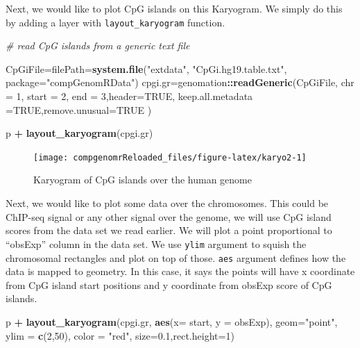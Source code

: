 \documentclass[12pt,]{krantz}
\newenvironment{Shaded}{\begin{snugshade}}{\end{snugshade}}
\newcommand{\CommentTok}[1]{\textcolor[rgb]{0.56,0.35,0.01}{\textit{#1}}}
\newcommand{\DataTypeTok}[1]{\textcolor[rgb]{0.13,0.29,0.53}{#1}}
\newcommand{\DecValTok}[1]{\textcolor[rgb]{0.00,0.00,0.81}{#1}}
\newcommand{\FloatTok}[1]{\textcolor[rgb]{0.00,0.00,0.81}{#1}}
\newcommand{\KeywordTok}[1]{\textcolor[rgb]{0.13,0.29,0.53}{\textbf{#1}}}
\newcommand{\NormalTok}[1]{#1}
\newcommand{\OperatorTok}[1]{\textcolor[rgb]{0.81,0.36,0.00}{\textbf{#1}}}
\newcommand{\OtherTok}[1]{\textcolor[rgb]{0.56,0.35,0.01}{#1}}
\newcommand{\StringTok}[1]{\textcolor[rgb]{0.31,0.60,0.02}{#1}}
\begin{document}
Next, we would like to plot CpG islands on this Karyogram. We simply do this
by adding a layer with \texttt{layout\_karyogram} function.

\begin{Shaded}
\begin{Highlighting}[]
\CommentTok{# read CpG islands from a generic text file}

\NormalTok{CpGiFile=filePath=}\KeywordTok{system.file}\NormalTok{(}\StringTok{"extdata"}\NormalTok{,}
                      \StringTok{"CpGi.hg19.table.txt"}\NormalTok{,}
                      \DataTypeTok{package=}\StringTok{"compGenomRData"}\NormalTok{)}
\NormalTok{cpgi.gr=genomation}\OperatorTok{::}\KeywordTok{readGeneric}\NormalTok{(CpGiFile, }
            \DataTypeTok{chr =} \DecValTok{1}\NormalTok{, }\DataTypeTok{start =} \DecValTok{2}\NormalTok{, }\DataTypeTok{end =} \DecValTok{3}\NormalTok{,}\DataTypeTok{header=}\OtherTok{TRUE}\NormalTok{, }
          \DataTypeTok{keep.all.metadata =}\OtherTok{TRUE}\NormalTok{,}\DataTypeTok{remove.unusual=}\OtherTok{TRUE}\NormalTok{ )}

\NormalTok{p }\OperatorTok{+}\StringTok{ }\KeywordTok{layout_karyogram}\NormalTok{(cpgi.gr)}
\end{Highlighting}
\end{Shaded}

\begin{figure}

{\centering \texttt{[image: compgenomrReloaded\_files/figure-latex/karyo2-1]} 

}

\caption{Karyogram of CpG islands over the human genome}\label{fig:karyo2}
\end{figure}

Next, we would like to plot some data over the chromosomes. This could be ChIP-seq
signal
or any other signal over the genome, we will use CpG island scores from the data set
we read earlier. We will plot a point proportional to ``obsExp'' column in the data set. We use \texttt{ylim} argument to squish the chromosomal rectangles and plot on top of those. \texttt{aes} argument defines how the data is mapped to geometry. In this case,
it says the points will have x coordinate from CpG island start positions and y coordinate from obsExp score of CpG islands.

\begin{Shaded}
\begin{Highlighting}[]
\NormalTok{p }\OperatorTok{+}\StringTok{ }\KeywordTok{layout_karyogram}\NormalTok{(cpgi.gr, }\KeywordTok{aes}\NormalTok{(}\DataTypeTok{x=}\NormalTok{ start, }\DataTypeTok{y =}\NormalTok{ obsExp),}
                     \DataTypeTok{geom=}\StringTok{"point"}\NormalTok{,}
                     \DataTypeTok{ylim =} \KeywordTok{c}\NormalTok{(}\DecValTok{2}\NormalTok{,}\DecValTok{50}\NormalTok{), }\DataTypeTok{color =} \StringTok{"red"}\NormalTok{,}
                     \DataTypeTok{size=}\FloatTok{0.1}\NormalTok{,}\DataTypeTok{rect.height=}\DecValTok{1}\NormalTok{)}
\end{Highlighting}
\end{Shaded}
\end{document}
